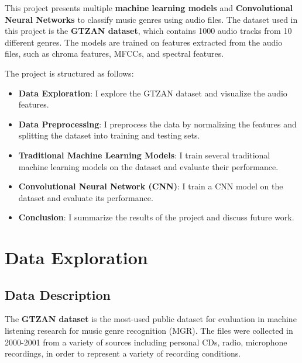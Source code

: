 \documentclass[11.5pt]{article}
\begin{document}
This project presents multiple \textbf{machine learning models} and \textbf{Convolutional Neural Networks} to classify music genres using audio files. The dataset used in this project is the \textbf{GTZAN dataset}, which contains 1000 audio tracks from 10 different genres. The models are trained on features extracted from the audio files, such as chroma features, MFCCs, and spectral features.

The project is structured as follows:
\begin{itemize}
    \item \textbf{Data Exploration}: I explore the GTZAN dataset and visualize the audio features.
    \item \textbf{Data Preprocessing}: I preprocess the data by normalizing the features and splitting the dataset into training and testing sets.
    \item \textbf{Traditional Machine Learning Models}: I train several traditional machine learning models on the dataset and evaluate their performance.
    \item \textbf{Convolutional Neural Network (CNN)}: I train a CNN model on the dataset and evaluate its performance.
    \item \textbf{Conclusion}: I summarize the results of the project and discuss future work.
\end{itemize}

\section{Data Exploration} \label{sec:data_exploration}
\subsection{Data Description}
The \textbf{GTZAN dataset} is the most-used public dataset for evaluation in machine listening research for music genre recognition (MGR). The files were collected in 2000-2001 from a variety of sources including personal CDs, radio, microphone recordings, in order to represent a variety of recording conditions.\cite{GTZANDatasetMusic}
\end{document}
